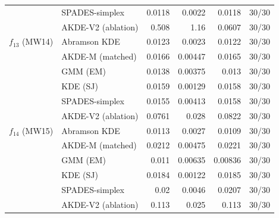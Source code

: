 \begin{tabular}{llrrrr}
 & SPADES-simplex & 0.0118 & 0.0022 & 0.0118 & 30/30 \\
 & AKDE-V2 (ablation) & 0.508 & 1.16 & 0.0607 & 30/30 \\
$f_{13}$ (MW14) & Abramson KDE & 0.0123 & 0.0023 & 0.0122 & 30/30 \\
 & AKDE-M (matched) & 0.0166 & 0.00447 & 0.0165 & 30/30 \\
 & GMM (EM) & 0.0138 & 0.00375 & 0.013 & 30/30 \\
 & KDE (SJ) & 0.0159 & 0.00129 & 0.0158 & 30/30 \\
 & SPADES-simplex & 0.0155 & 0.00413 & 0.0158 & 30/30 \\
 & AKDE-V2 (ablation) & 0.0761 & 0.028 & 0.0822 & 30/30 \\
$f_{14}$ (MW15) & Abramson KDE & 0.0113 & 0.0027 & 0.0109 & 30/30 \\
 & AKDE-M (matched) & 0.0212 & 0.00475 & 0.0221 & 30/30 \\
 & GMM (EM) & 0.011 & 0.00635 & 0.00836 & 30/30 \\
 & KDE (SJ) & 0.0184 & 0.00122 & 0.0185 & 30/30 \\
 & SPADES-simplex & 0.02 & 0.0046 & 0.0207 & 30/30 \\
 & AKDE-V2 (ablation) & 0.113 & 0.025 & 0.113 & 30/30 \\
\bottomrule
\end{tabular}